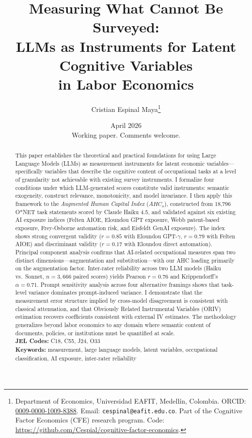 \documentclass[11pt,a4paper]{article}
\title{\textbf{Measuring What Cannot Be Surveyed:}\\[4pt]
LLMs as Instruments for Latent Cognitive Variables\\
in Labor Economics}
\author{Cristian Espinal Maya\thanks{Department of Economics, Universidad EAFIT, Medell\'in, Colombia. ORCID: \href{https://orcid.org/0009-0000-1009-8388}{0009-0000-1009-8388}. Email: \texttt{cespinal@eafit.edu.co}. Part of the Cognitive Factor Economics (CFE) research program. Code: \url{https://github.com/Cespial/cognitive-factor-economics}.}}
\date{April 2026\\[6pt]{\small Working paper. Comments welcome.}}
\theoremstyle{definition}
\begin{document}
\maketitle

\begin{abstract}
\noindent
This paper establishes the theoretical and practical foundations for using Large Language Models (LLMs) as measurement instruments for latent economic variables---specifically variables that describe the cognitive content of occupational tasks at a level of granularity not achievable with existing survey instruments. I formalize four conditions under which LLM-generated scores constitute valid instruments: semantic exogeneity, construct relevance, monotonicity, and model invariance. I then apply this framework to the \textit{Augmented Human Capital Index} ($AHC_o$), constructed from 18,796 O*NET task statements scored by Claude Haiku 4.5, and validated against six existing AI exposure indices (Felten AIOE, Eloundou GPT exposure, Webb patent-based exposure, Frey-Osborne automation risk, and Eisfeldt GenAI exposure). The index shows strong convergent validity ($r = 0.85$ with Eloundou GPT-$\gamma$, $r = 0.79$ with Felten AIOE) and discriminant validity ($r = 0.17$ with Eloundou direct automation). Principal component analysis confirms that AI-related occupational measures span two distinct dimensions---augmentation and substitution---with our AHC loading primarily on the augmentation factor. Inter-rater reliability across two LLM models (Haiku vs.\ Sonnet, $n = 3{,}666$ paired scores) yields Pearson $r = 0.76$ and Krippendorff's $\alpha = 0.71$. Prompt sensitivity analysis across four alternative framings shows that task-level variance dominates prompt-induced variance. I demonstrate that the measurement error structure implied by cross-model disagreement is consistent with classical attenuation, and that Obviously Related Instrumental Variables (ORIV) estimation recovers coefficients consistent with external IV estimates. The methodology generalizes beyond labor economics to any domain where semantic content of documents, policies, or institutions must be quantified at scale.\\[6pt]
\noindent\textbf{JEL Codes:} C18, C55, J24, O33\\[3pt]
\noindent\textbf{Keywords:} measurement, large language models, latent variables, occupational classification, AI exposure, inter-rater reliability
\end{abstract}

\newpage
\tableofcontents
\newpage
\end{document}

